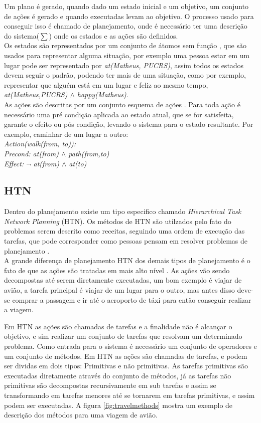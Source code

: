 Um plano é gerado, quando dado um estado inicial e um objetivo, um conjunto de ações é gerado e quando executadas levam ao objetivo. O processo usado para conseguir isso é chamado de planejamento, onde é necessário ter uma descrição do sistema($\sum$) onde os estados e as ações são definidos.\\ 
Os estados são representados por um conjunto de átomos sem função \cite{intelligence2003modern}, que são usados para representar alguma situação, por exemplo uma pessoa estar em um lugar pode ser representado por \textit{at(Matheus, PUCRS)}, assim todos os estados devem seguir o padrão, podendo ter mais de uma situação, como por exemplo, representar que alguém está em um lugar e feliz ao mesmo tempo, \textit{at(Matheus,PUCRS) $\wedge$ happy(Matheus)}. \\
As ações são descritas por um conjunto esquema de ações \cite{intelligence2003modern}. Para toda ação é necessário uma pré condição aplicada ao estado atual, que se for satisfeita, garante o efeito ou pós condição, levando o sistema para o estado resultante. Por exemplo, caminhar de um lugar a outro: \\
\textit{Action(walk(from, to)): \\
Precond: at(from)  $\wedge$ path(from,to) \\
Effect: $\neg$ at(from)  $\wedge$ at(to)}

\subsection{HTN} 
Dentro do planejamento existe um tipo especifico chamado \textit{Hierarchical Task Network Planning} (HTN). Os métodos de HTN são utilzados pelo fato do problemas serem descrito como receitas, seguindo uma ordem de execução das tarefas, que pode corresponder como pessoas pensam em resolver problemas de planejamento \cite{ghallab2004automated}.  \\
A grande diferença de planejamento HTN dos demais tipos de planejamento é o fato de que as ações são tratadas em mais alto nível \cite{intelligence2003modern}. As ações vão sendo decompostas até serem diretamente executadas, um bom exemplo é viajar de avião, a tarefa principal é viajar de um lugar para o outro, mas antes disso deve-se comprar a passagem e ir até o aeroporto de táxi para então conseguir realizar a viagem. 

Em HTN as ações são chamadas de tarefas e a finalidade não é alcançar o objetivo, e sim realizar um conjunto de tarefas que resolvam um determinado problema. Como entrada para o sistema é necessário um conjunto de operadores e um conjunto de métodos. Em HTN as ações são chamadas de tarefas, e podem ser dividas em dois tipos: Primitivas e não primitivas. As tarefas primitivas são executadas diretamente através do conjunto de métodos, já as tarefas não primitivas são decompostas recursivamente em sub tarefas e assim se transformando em tarefas menores até se tornarem em tarefas primitivas, e assim podem ser executadas. A figura \ref{fig:travelmethods} mostra um exemplo de descrição dos métodos para uma viagem de avião.

